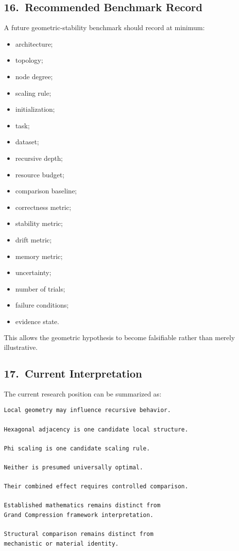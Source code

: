 \subsection*{16.\ Recommended Benchmark Record}

A future geometric-stability benchmark should record at minimum:

\begin{itemize}
    \item architecture;
    \item topology;
    \item node degree;
    \item scaling rule;
    \item initialization;
    \item task;
    \item dataset;
    \item recursive depth;
    \item resource budget;
    \item comparison baseline;
    \item correctness metric;
    \item stability metric;
    \item drift metric;
    \item memory metric;
    \item uncertainty;
    \item number of trials;
    \item failure conditions;
    \item evidence state.
\end{itemize}

This allows the geometric hypothesis to become falsifiable rather than merely
illustrative.

\subsection*{17.\ Current Interpretation}

The current research position can be summarized as:

\begin{verbatim}
Local geometry may influence recursive behavior.

Hexagonal adjacency is one candidate local structure.

Phi scaling is one candidate scaling rule.

Neither is presumed universally optimal.

Their combined effect requires controlled comparison.

Established mathematics remains distinct from
Grand Compression framework interpretation.

Structural comparison remains distinct from
mechanistic or material identity.
\end{verbatim}

